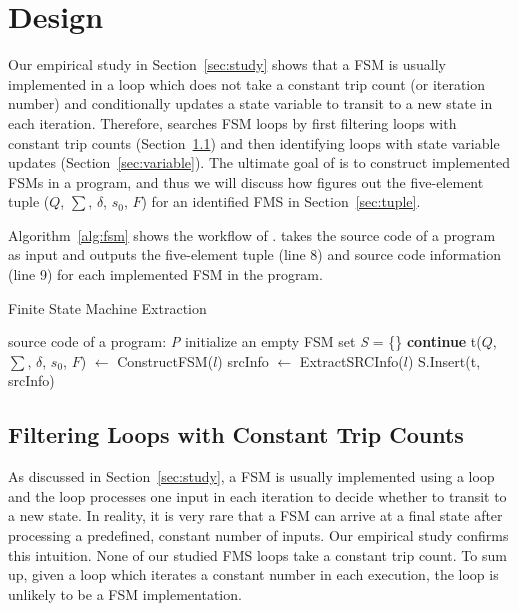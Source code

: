\section{\Tool{} Design}
\label{sec:impl}

Our empirical study in Section~\ref{sec:study} 
shows that a FSM is usually implemented in a loop 
which does not take a constant trip count (or iteration number) 
and conditionally updates a state variable 
to transit to a new state in each iteration. 
Therefore, \Tool{} searches FSM loops
by first filtering loops with constant trip counts (Section~\ref{sec:constant}) 
and then identifying loops with state variable updates (Section~\ref{sec:variable}).
The ultimate goal of \Tool{} is to construct implemented FSMs in a program, 
and thus we will discuss how \Tool{} figures out the five-element tuple 
($Q$, $\sum$, $\delta$, $s_0$, $F$) 
for an identified FMS in Section~\ref{sec:tuple}. 

Algorithm~\ref{alg:fsm} shows the workflow of \Tool{}.
\Tool{} takes the source code of a program as input
and outputs the five-element tuple (line 8) 
and source code information (line 9) for each 
implemented FSM in the program.  



\begin{algorithm}[!htb]
    \caption{Finite State Machine Extraction}
    \label{alg:fsm}
    \begin{algorithmic}[1]
        \Require source code of a program: \emph{P}
        \State initialize an empty FSM set \emph{S} = \{\}
        		\State \textbf{continue}
        	\EndIf
        			\State t($Q$, $\sum$, $\delta$, $s_0$, $F$) $\gets$ ConstructFSM($l$)
        			\State srcInfo $\gets$ ExtractSRCInfo($l$) 
        			\State S.Insert(t, srcInfo)
        	\EndIf
        \EndFor
        \State {}
        \EndFunction
    \end{algorithmic}
\end{algorithm}


\subsection{Filtering Loops with Constant Trip Counts}
\label{sec:constant}

As discussed in Section~\ref{sec:study},
a FSM is usually implemented using a loop 
and the loop processes one input in each iteration to decide 
whether to transit to a new state. 
In reality, it is very rare that a FSM can arrive at a final state 
after processing a predefined, constant number of inputs.
Our empirical study confirms this intuition. 
None of our studied FMS loops take a constant trip count.  
To sum up, given a loop which iterates a constant 
number in each execution, 
the loop is unlikely to be a FSM implementation. 


